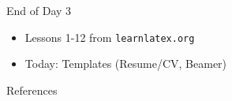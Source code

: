 \documentclass{beamer}
\begin{document}
{  %

\begin{frame}{End of Day 3}
  \begin{itemize}
    \item Lessons 1-12 from \texttt{learnlatex.org}
    \item Today: Templates (Resume/CV, Beamer)
  \end{itemize}
\end{frame}

\begin{frame}{References}
  
  
\end{frame}

} %
\end{document}
